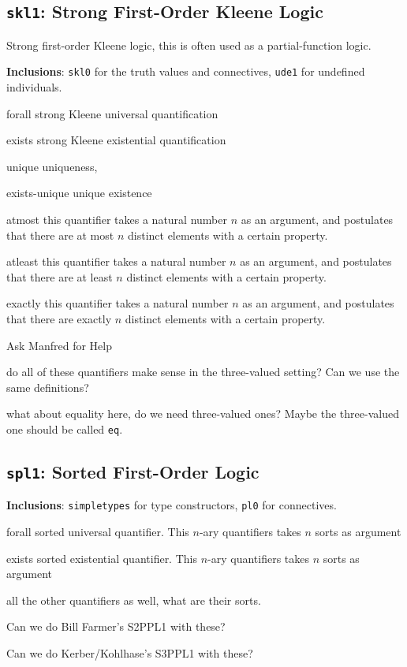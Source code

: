 \documentclass{article}
\begin{document}
\subsection{{\tt{skl1}}: Strong First-Order Kleene Logic}

Strong first-order Kleene logic, this is often used as a partial-function logic.

{\bf Inclusions}: {\tt{skl0}} for the truth values and connectives, {\tt{ude1}}
for undefined individuals.
\begin{constlist}
  \item[forall] strong Kleene universal quantification
  \item[exists] strong Kleene existential quantification
  \item[unique] uniqueness, 
  \item[exists-unique] unique existence
  \item[atmost] this quantifier takes a natural number $n$ as an argument, and
    postulates that there are at most $n$ distinct elements with a certain property.
  \item[atleast] this quantifier takes a natural number $n$ as an argument, and
    postulates that there are at least $n$ distinct elements with a certain property.
  \item[exactly] this quantifier takes a natural number $n$ as an argument, and
    postulates that there are exactly $n$ distinct elements with a certain property.
\end{constlist}

\begin{todolist}{Ask Manfred for Help}
  \item do all of these quantifiers make sense in the three-valued setting? Can we
    use the same definitions?
  \item what about equality here, do we need three-valued ones? Maybe the
    three-valued one should be called {\tt{eq}}.
\end{todolist}

\subsection{{\tt{spl1}}: Sorted First-Order Logic}

{\bf Inclusions}: {\tt{simpletypes}} for type constructors, {\tt{pl0}} for connectives.
\begin{constlist}
\item[forall] sorted universal quantifier. This $n$-ary quantifiers takes $n$
  sorts as argument
\item[exists] sorted existential quantifier. This $n$-ary quantifiers takes $n$
  sorts as argument
\end{constlist}
\begin{todolist}{}
  \item all the other quantifiers as well, what are their sorts.
  \item Can we do Bill Farmer's S2PPL1 with these?
  \item Can we do Kerber/Kohlhase's S3PPL1 with these?
\end{todolist}
\end{document}

